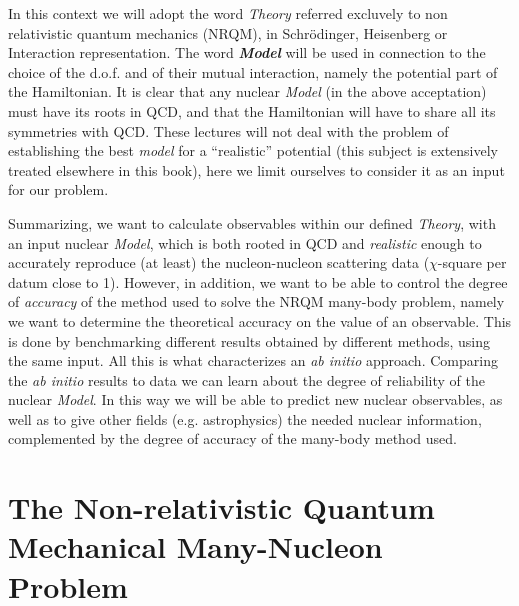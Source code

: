In this context we will adopt the word {\it Theory} referred excluvely to non relativistic quantum mechanics (NRQM), 
in Schr\"odinger, Heisenberg or Interaction representation. The word {\it \bf Model} will be used in connection to the choice
of the d.o.f. and of their mutual interaction, namely  the potential part of the Hamiltonian.
It is clear that any nuclear {\it  Model} (in the above acceptation) must have its roots in QCD, and that the Hamiltonian 
will have to share all its symmetries with QCD.  
These lectures will not deal with the problem of establishing the best {\it model} for a ``realistic'' potential 
(this subject is extensively treated elsewhere 
in this book), here we limit ourselves to consider it as an input for our problem. 

Summarizing, we want to calculate observables within our defined {\it Theory}, with an input nuclear {\it Model}, 
which is both rooted in QCD and {\it realistic} enough to accurately reproduce (at least) 
the nucleon-nucleon scattering data ($\chi$-square per datum close to 1).
However, in addition, we want to be able to control the degree of {\it accuracy} of the method used to solve 
the NRQM many-body problem, namely  we want to determine the theoretical accuracy on the value of an observable.
This is done by benchmarking different results obtained by different methods, using the same input.
All this is what characterizes an {\it ab initio} approach. Comparing the {\it ab initio} results to data we can 
learn about the degree of reliability of the nuclear {\it Model}. In this way we will be
able to predict new nuclear observables, as well as to give other fields (e.g. astrophysics) the needed nuclear information,
complemented by the degree of accuracy of the many-body method used.

\section{The Non-relativistic Quantum Mechanical Many-Nucleon Problem}\label{sec:NRQMP}

